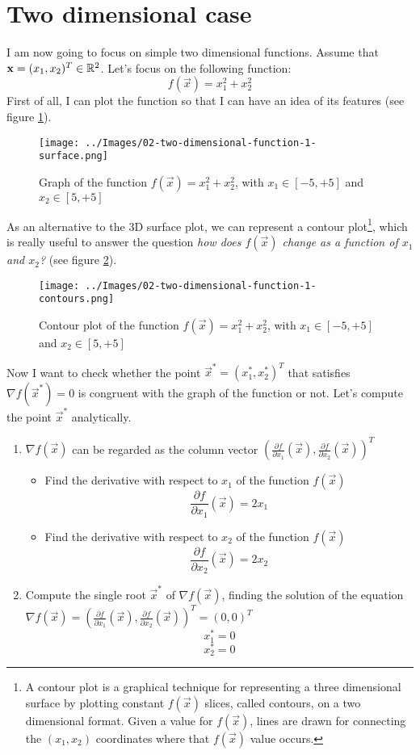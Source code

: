 \section{Two dimensional case}
    I am now going to focus on simple two dimensional functions. Assume that \(\mathbf{x} = (x_1, x_2)^T \in \mathbb{R}^2\). Let's focus on the following function:
    \[f(\vec{x}) = x_{1}^{2} + x_{2}^{2}\]
    First of all, I can plot the function so that I can have an idea of its features (see figure \ref{two-dimensional-function-1-surface}).
    \begin{figure}
        \centering
        \texttt{[image: ../Images/02-two-dimensional-function-1-surface.png]}
        \caption{Graph of the function \(f(\vec{x}) = x_{1}^{2} + x_{2}^{2}\), with \(x_1 \in [-5, +5]\) and \(x_2 \in [5, +5]\)}
        \label{two-dimensional-function-1-surface}
    \end{figure}
    As an alternative to the 3D surface plot, we can represent a contour plot\footnote{A contour plot is a graphical technique for representing a three dimensional surface by plotting constant \(f(\vec{x})\) slices, called contours, on a two dimensional format. Given a value for \(f(\vec{x})\), lines are drawn for connecting the \((x_1, x_2)\) coordinates where that \(f(\vec{x})\) value occurs.}, which is really useful to answer the question \emph{how does \(f(\vec{x})\) change as a function of \(x_1\) and \(x_2\)?} (see figure \ref{two-dimensional-function-1-contours}).\par
    \begin{figure}
        \centering
        \texttt{[image: ../Images/02-two-dimensional-function-1-contours.png]}
        \caption{Contour plot of the function \(f(\vec{x}) = x_{1}^{2} + x_{2}^{2}\), with \(x_1 \in [-5, +5]\) and \(x_2 \in [5, +5]\)}
        \label{two-dimensional-function-1-contours}
    \end{figure}
    Now I want to check whether the point \(\vec{x}^* = (x_{1}^{*}, x_{2}^{*})^T\) that satisfies \(\nabla f(\vec{x}^*) = 0\) is congruent with the graph of the function or not. Let's compute the point \(\vec{x}^*\) analytically.
    \begin{enumerate}
        \item \(\nabla f(\vec{x})\) can be regarded as the column vector \((\frac{\partial f}{\partial x_1}(\vec{x}), \frac{\partial f}{\partial x_2}(\vec{x}))^T\)
        \begin{itemize}
            \item Find the derivative with respect to \(x_1\) of the function \(f(\vec{x})\)
            \[\frac{\partial f}{\partial x_1}(\vec{x}) = 2x_1\]
            \item Find the derivative with respect to \(x_2\) of the function \(f(\vec{x})\)
            \[\frac{\partial f}{\partial x_2}(\vec{x}) = 2x_2\]
        \end{itemize}
        \item Compute the single root \(\vec{x}^{*}\) of \(\nabla f(\vec{x})\), finding the solution of the equation \(\nabla f(\vec{x}) = (\frac{\partial f}{\partial x_1}(\vec{x}), \frac{\partial f}{\partial x_2}(\vec{x}))^T = (0, 0)^T\)
        \[x^{*}_{1} = 0\]
        \[x^{*}_{2} = 0\]
    \end{enumerate}

